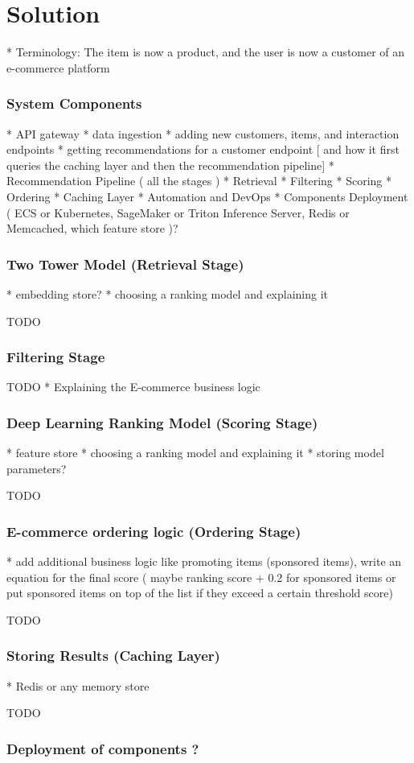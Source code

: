 \chapter{Solution}


* Terminology: The item is now a product, and the user is now a customer of an e-commerce platform

\subsection{System Components}


* API gateway
    * data ingestion
    * adding new customers, items, and interaction endpoints 
    * getting recommendations for a customer endpoint [ and how it first queries the caching layer and then the recommendation pipeline]
* Recommendation Pipeline ( all the stages )
    * Retrieval
    * Filtering
    * Scoring
    * Ordering
* Caching Layer
* Automation and DevOps
* Components Deployment ( ECS or Kubernetes, SageMaker or Triton Inference Server, Redis or Memcached, which feature store )?



\subsection{Two Tower Model (Retrieval Stage)}

* embedding store?
* choosing a ranking model and explaining it

TODO 

\subsection{Filtering Stage}

TODO
* Explaining the E-commerce business logic


\subsection{Deep Learning Ranking Model (Scoring Stage)}

* feature store 
* choosing a ranking model and explaining it
* storing model parameters?


TODO

\subsection{E-commerce ordering logic (Ordering Stage)}

* add additional business logic like promoting items (sponsored items), write an equation for the final score ( maybe ranking score + 0.2 for sponsored items or put sponsored items on top of the list if they exceed a certain threshold score)

TODO

\subsection{Storing Results (Caching Layer)}

* Redis or any memory store

TODO

\subsection{Deployment of components ?}


\minitoc
